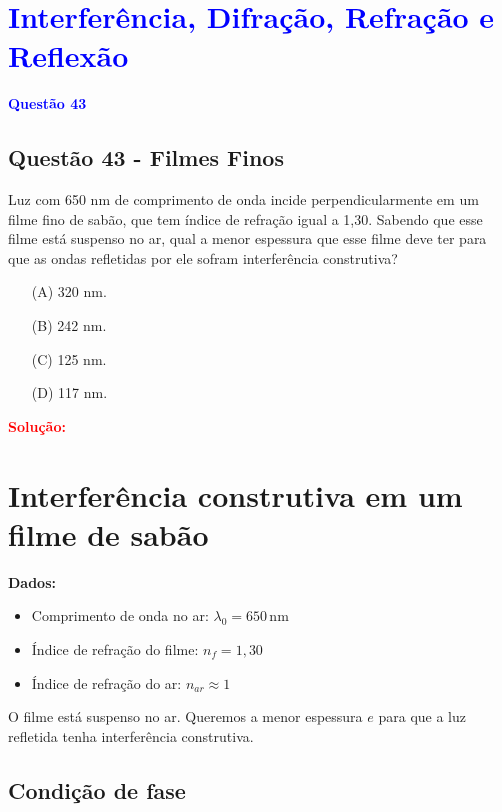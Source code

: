 \section{\large \textcolor{blue}{Interferência, Difração, Refração e Reflexão}}

\begin{flushleft}
\textbf{\textcolor{blue}{\Large Quest\~ao 43}}\\
\noindent
\subsection{Quest\~ao 43 - Filmes Finos}
Luz com 650 nm de comprimento de onda incide
perpendicularmente em um filme fino de sabão, que tem
índice de refração igual a 1,30. Sabendo que esse filme está
suspenso no ar, qual a menor espessura que esse filme
deve ter para que as ondas refletidas por ele sofram
interferência construtiva?

\begin{itemize}
\item[(A)] 320 nm.
\item[(B)] 242 nm.
\item[(C)] 125 nm.
\item[(D)] 117 nm.
\end{itemize}

\vspace{0.5cm}

\textcolor{red}{\textbf{Solução:}}\\

\section*{Interferência construtiva em um filme de sabão}

\textbf{Dados:}
\begin{itemize}
    \item Comprimento de onda no ar: \( \lambda_0 = 650\,\mathrm{nm} \)
    \item Índice de refração do filme: \( n_f = 1{,}30 \)
    \item Índice de refração do ar: \( n_{ar} \approx 1 \)
\end{itemize}

O filme está suspenso no ar. Queremos a menor espessura \(e\) para que a luz refletida tenha interferência construtiva.

\subsection*{Condição de fase}


\end{flushleft}
